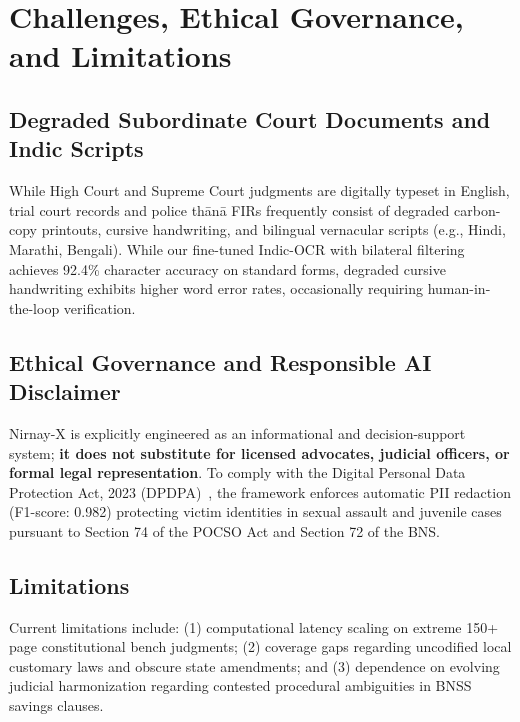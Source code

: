 \documentclass[conference]{IEEEtran}
\begin{document}
\section{Challenges, Ethical Governance, and Limitations}

\subsection{Degraded Subordinate Court Documents and Indic Scripts}
While High Court and Supreme Court judgments are digitally typeset in English, trial court records and police thānā FIRs frequently consist of degraded carbon-copy printouts, cursive handwriting, and bilingual vernacular scripts (e.g., Hindi, Marathi, Bengali). While our fine-tuned Indic-OCR with bilateral filtering achieves 92.4\% character accuracy on standard forms, degraded cursive handwriting exhibits higher word error rates, occasionally requiring human-in-the-loop verification.

\subsection{Ethical Governance and Responsible AI Disclaimer}
Nirnay-X is explicitly engineered as an informational and decision-support system; \textbf{it does not substitute for licensed advocates, judicial officers, or formal legal representation}. To comply with the Digital Personal Data Protection Act, 2023 (DPDPA)~\cite{dpdpa2023}, the framework enforces automatic PII redaction (F1-score: 0.982) protecting victim identities in sexual assault and juvenile cases pursuant to Section 74 of the POCSO Act and Section 72 of the BNS.

\subsection{Limitations}
Current limitations include: (1) computational latency scaling on extreme 150+ page constitutional bench judgments; (2) coverage gaps regarding uncodified local customary laws and obscure state amendments; and (3) dependence on evolving judicial harmonization regarding contested procedural ambiguities in BNSS savings clauses.

\end{document}
